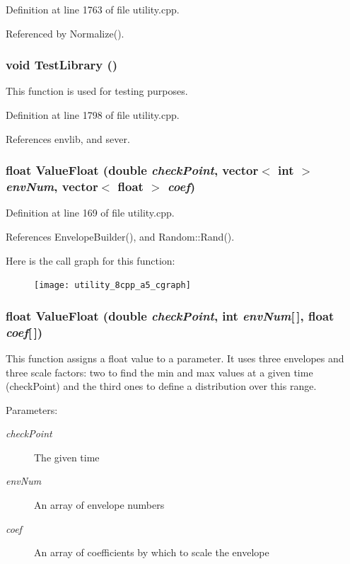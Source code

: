 Definition at line 1763 of file utility.cpp.

Referenced by Normalize().
\subsubsection{\setlength{\rightskip}{0pt plus 5cm}void Test\-Library ()}\label{utility_8cpp_a33}


This function is used for testing purposes. 

Definition at line 1798 of file utility.cpp.

References envlib, and sever.
\subsubsection{\setlength{\rightskip}{0pt plus 5cm}float Value\-Float (double {\em check\-Point}, vector$<$ int $>$ {\em env\-Num}, vector$<$ float $>$ {\em coef})}\label{utility_8cpp_a5}




Definition at line 169 of file utility.cpp.

References Envelope\-Builder(), and Random::Rand().

Here is the call graph for this function:\begin{figure}[H]
\begin{center}
\leavevmode
\texttt{[image: utility\_8cpp\_a5\_cgraph]}
\end{center}
\end{figure}
\subsubsection{\setlength{\rightskip}{0pt plus 5cm}float Value\-Float (double {\em check\-Point}, int {\em env\-Num}[$\,$], float {\em coef}[$\,$])}\label{utility_8cpp_a4}


This function assigns a float value to a parameter. It uses three envelopes and three scale factors: two to find the min and max values at a given time (check\-Point) and the third ones to define a distribution over this range. \begin{Desc}
\item[Parameters:]
\begin{description}
\item[{\em check\-Point}]The given time \item[{\em env\-Num}]An array of envelope numbers \item[{\em coef}]An array of coefficients by which to scale the envelope \end{description}
\end{Desc}


